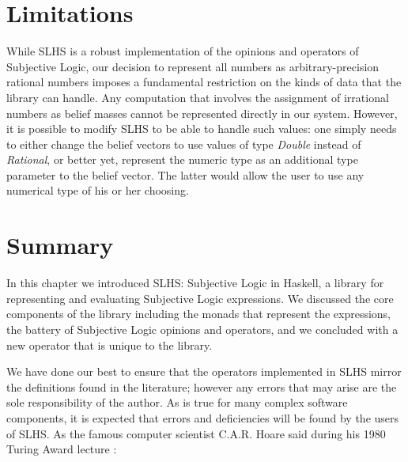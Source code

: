 \documentclass[thesis.tex]{subfiles}
\begin{document}







\section{Limitations}
\label{sec:limitations}

While SLHS is a robust implementation of the opinions and operators of Subjective Logic,
our decision to represent all numbers as arbitrary-precision rational numbers imposes a
fundamental restriction on the kinds of data that the library can handle. Any computation
that involves the assignment of irrational numbers as belief masses cannot be represented
directly in our system. However, it is possible to modify SLHS to be able to handle such
values: one simply needs to either change the belief vectors to use values of type
\emph{Double} instead of \emph{Rational}, or better yet, represent the numeric type as
an additional type parameter to the belief vector. The latter would allow the user to
use any numerical type of his or her choosing.




%
%



\section{Summary}

In this chapter we introduced SLHS: Subjective Logic in Haskell, a library
for representing and evaluating Subjective Logic expressions. We discussed the core
components of the library including the monads that represent the expressions, the
battery of Subjective Logic opinions and operators, and we concluded with a new operator
that is unique to the library.

We have done our best to ensure that the operators implemented in SLHS mirror the definitions
found in the literature; however any errors that may arise are the sole responsibility of the author.
As is true for many complex software components, it is expected that errors and deficiencies will
be found by the users of SLHS. As the famous computer scientist C.A.R. Hoare said during his 1980 Turing Award lecture \cite{hoare19811980}:
\end{document}
